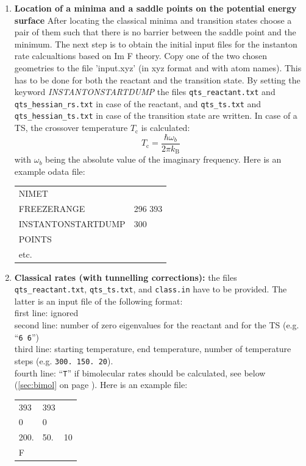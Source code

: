 \documentclass[12pt,a4paper,dvips]{article}
\begin{document}
\begin{enumerate}
\item \textbf{Location of a minima and a saddle points on the potential energy surface}
After locating the classical minima and transition states choose a pair of them such that there is no
barrier between the saddle point and the minimum. The next step is to obtain the initial input files for the 
instanton rate calcualtions based on Im F theory. Copy one of the two chosen geometries to the file 'input.xyz' (in xyz format and with atom names). This has to be done for both the reactant and the transition state.
By setting the keyword {\it INSTANTONSTARTDUMP\/} the files \texttt{qts\_reactant.txt} and
\texttt{qts\_hessian\_rs.txt} in case of the reactant, and \texttt{qts\_ts.txt}
and \texttt{qts\_hessian\_ts.txt} in case of the transition state are written. In case of
a TS, the crossover temperature $T_\mathrm{c}$ is calculated:
\begin{equation}
  T_\mathrm{c}=\frac{\hbar \omega_b}{2\pi k_\mathrm{B}}
\end{equation}
with $\omega_b$ being the absolute value of the imaginary frequency.
Here is an example odata file:

\begin{tabular}{ll}
NIMET & \\
FREEZERANGE & 296 393\\
INSTANTONSTARTDUMP & 300 \\
POINTS & \\
etc.& \\
\end{tabular}


\item \textbf{Classical rates (with tunnelling corrections):} the files \texttt{qts\_reactant.txt},
  \texttt{qts\_ts.txt}, and \texttt{class.in} have to be provided. The latter is an
  input file of the following format: \\ first line: ignored\\ second line:
  number of zero eigenvalues for the reactant and for the TS
  (e.g. ``\texttt{6~6}'')\\ third line: starting temperature, end temperature,
  number of temperature steps (e.g. \texttt{300.~150.~20}).\\ fourth line:
  ``\texttt{T}'' if bimolecular rates should be calculated, see below
  (\ref{sec:bimol} on page \pageref{sec:bimol}).
  Here is an example file:
  
  \begin{tabular}{lll}
  393 &  393 & \\
  0   &  0 & \\
  200. & 50. &10 \\
  F   &    &  \\
  \end{tabular} 
  

\end{enumerate}
\end{document}
